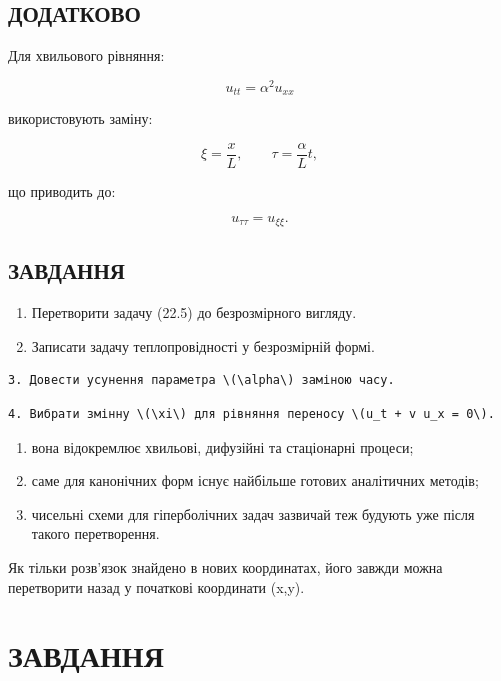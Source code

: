 \documentclass[
  ukrainian,
]{article}
\begin{document}
\subsection{ДОДАТКОВО}\label{ux434ux43eux434ux430ux442ux43aux43eux432ux43e}

Для хвильового рівняння:

\[
u_{tt} = \alpha^2 u_{xx}
\]

використовують заміну:

\[
\xi = \frac{x}{L}, \qquad \tau = \frac{\alpha}{L} t,
\]

що приводить до:

\[
u_{\tau\tau} = u_{\xi\xi}.
\]

\subsection{ЗАВДАННЯ}\label{ux437ux430ux432ux434ux430ux43dux43dux44f-15}

\begin{enumerate}
\def\labelenumi{\arabic{enumi}.}
\item
  Перетворити задачу (22.5) до безрозмірного вигляду.
\item
  Записати задачу теплопровідності у безрозмірній формі.
\end{enumerate}

\begin{verbatim}
3. Довести усунення параметра \(\alpha\) заміною часу.
\end{verbatim}

\begin{verbatim}
4. Вибрати змінну \(\xi\) для рівняння переносу \(u_t + v u_x = 0\).
\end{verbatim}

\begin{enumerate}
\def\labelenumi{\arabic{enumi}.}
\setcounter{enumi}{4}
\item
  вона відокремлює хвильові, дифузійні та стаціонарні процеси;
\item
  саме для канонічних форм існує найбільше готових аналітичних методів;
\item
  чисельні схеми для гіперболічних задач зазвичай теж будують уже після
  такого перетворення.
\end{enumerate}

Як тільки розв'язок знайдено в нових координатах, його завжди можна
перетворити назад у початкові координати (x,y).

\section{ЗАВДАННЯ}\label{ux437ux430ux432ux434ux430ux43dux43dux44f-16}
\end{document}
